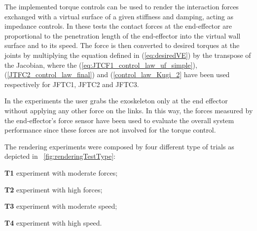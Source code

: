 The implemented torque controls can be used to render the interaction forces exchanged with a virtual surface of a given stiffness and damping, acting as impedance controls. In these tests the contact forces at the end-effector are proportional to the penetration length of the end-effector into the virtual wall surface and to its speed. The force is then converted to desired torques at the joints by multiplying the equation defined in (\ref{eq:desiredVE}) by the transpose of the Jacobian, where the \DIFdelbegin {}\DIFdelend \DIFaddbegin {}\DIFaddend (\ref{eq:JTCF1_control_law_uf_simple}), (\ref{JTFC2_control_law_final}) and (\ref{control_law_Kugi_2} \DIFdelbegin \DIFdel{) }\DIFdelend have been used respectively for JFTC1, JFTC2 and JFTC3.
\par In the experiments the user grabs the exoskeleton only at the end effector without applying any other force on the links. In this way, the forces measured by the end-effector's force sensor have been used to evaluate the overall system performance since these forces are not involved for the torque control.
\par The rendering experiments were composed by four different type of trials as depicted in \figurename \ \ref{fig:renderingTestType}:
\DIFdelbegin %
\DIFdelend \DIFaddbegin \begin{IEEEdescription}
\item[{\bf T1 }]  \DIFaddend experiment with moderate forces;
\DIFdelbegin %
\DIFdelend \DIFaddbegin \item[{\bf T2 }]  \DIFaddend experiment with high forces;
\DIFdelbegin %
\DIFdelend \DIFaddbegin \item[{\bf T3 }]   \DIFaddend experiment with moderate speed;
\DIFdelbegin %
\DIFdelend \DIFaddbegin \item[{\bf T4 }]  \DIFaddend experiment with high speed.
\DIFdelbegin %
\DIFdelend \DIFaddbegin \end{IEEEdescription}
\DIFaddend 

